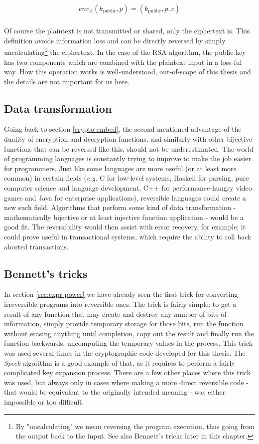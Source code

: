 \documentclass[a4paper,10pt,openright]{memoir}
\newcommand{\eg}{\emph{e.g.}\xspace}
\def\enc{\ensuremath{\mathit{enc}}}
\newcommand{\term}[1]{\textit{#1}}
\begin{document}
\begin{align*}
\enc_A(k_\text{public},p) = (k_\text{public}, p, c) \\
\end{align*}

Of course the plaintext is not transmitted or shared, only the 
ciphertext is. This definition avoids information loss and can be 
directly reversed by simply uncalculating\footnote{By "uncalculating" 
we mean reversing the program execution, thus going from the output 
back to the input. See also Bennett's tricks later in this chapter.} 
the ciphertext. In the case of the RSA algorithm, the public key has 
two components which are combined with the plaintext input in a 
loss-ful way. How this operation works is well-understood, out-of-scope 
of this thesis and the details are not important for us here.

\subsection{Data transformation}

Going back to section \ref{crypto-embed}, the second mentioned 
advantage of the duality of encryption and decryption functions, and 
similarly with other bijective functions that can be reversed like 
this, should not be underestimated. The world of programming languages 
is constantly trying to improve to make the job easier for programmers. 
Just like some languages are more useful (or at least more common) in 
certain fields (\eg C for low-level systems, Haskell for parsing, pure 
computer science and language development, C++ for performance-hungry 
video games and Java for enterprise applications), reversible languages 
could create a new such field. Algorithms that perform some kind of 
data transformation - mathematically bijective or at least injective 
function application - would be a good fit. The reversibility would 
then assist with error recovery, for example; it could prove useful in 
transactional systems, which require the ability to roll back aborted 
transactions.

\subsection{Bennett's tricks}

In section \ref{sec:expr-power} we have already seen the first trick 
for converting irreversible programs into reversible ones. The trick is 
fairly simple: to get a result of any function that may create and 
destroy any number of bits of information, simply provide temporary 
storage for those bits, run the function without erasing anything until 
completion, copy out the result and finally run the function backwards, 
uncomputing the temporary values in the process. This trick was used 
several times in the cryptographic code developed for this thesis. The 
\term{Speck} algorithm is a good example of that, as it requires to 
perform a fairly complicated key expansion process. There are a few 
other places where this trick was used, but always only in cases where 
making a more direct reversible code - that would be equivalent to the 
originally intended meaning - was either impossible or too difficult.
\end{document}
